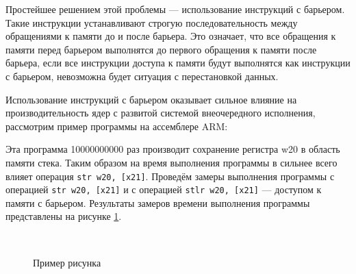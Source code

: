 Простейшее решением этой проблемы --- использование инструкций с барьером. Такие инструкции устанавливают строгую последовательность между обращениями к памяти до и после барьера. Это означает, что все обращения к памяти перед барьером выполнятся до первого обращения к памяти после барьера, если все инструкции доступа к памяти будут выполнятся как инструкции с барьером, невозможна будет ситуация с перестановкой данных.

Использование инструкций с барьером оказывает сильное влияние на производительность ядер с развитой системой внеочередного исполнения, рассмотрим пример программы на ассемблере ARM:


Эта программа 10000000000 раз производит сохранение регистра w20 в область памяти стека. Таким образом на время выполнения программы в сильнее всего влияет операция \texttt{str w20, [x21]}. Проведём замеры выполнения программы с операцией \texttt{str w20, [x21]} и с операцией \texttt{stlr w20, [x21]} --- доступом к памяти с барьером. Результаты замеров времени выполнения программы представлены на рисунке \ref{fig:speed}.

\begin{figure}[hbtp]
	\centering
	\\
	\caption{Пример рисунка}
	\label{fig:speed}
\end{figure}

